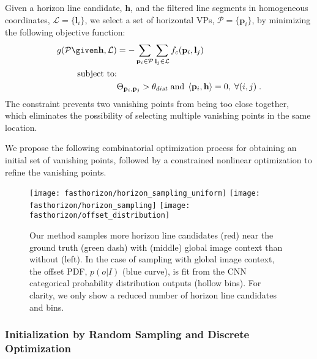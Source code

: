 Given a horizon line candidate, $\mathbf{h}$, and the filtered line segments
in homogeneous coordinates, $\mathcal{L} = \{\mathbf{l}_i\}$, we select
a set of horizontal VPs, $\mathcal{P} = \{\mathbf{p}_i\}$, by minimizing
the following objective function:
%
\begin{align} 
  g(\mathcal{P} \given \mathbf{h}, \mathcal{L}) & = -\sum_{\mathbf{p}_i
    \in \mathcal{P}} {\sum_{\mathbf{l}_j \in
      \mathcal{L}}f_c(\mathbf{p}_i, \mathbf{l}_j)}
  \label{eq:obj} \\
  \text{subject to:} \nonumber \\
   & \Theta_{\mathbf{p}_i,\mathbf{p}_j} > \theta_{dist}
  \; \text{and} \; \left< \mathbf{p}_i,\mathbf{h} \right>=0, 
  \; \forall (i,j) \nonumber \; .
\end{align} 
%
The constraint prevents two vanishing points from being too close
together, which eliminates the possibility of selecting multiple
vanishing points in the same location.

We propose the following combinatorial optimization process for
obtaining an initial set of vanishing points, followed by a
constrained nonlinear optimization to refine the vanishing points.

\begin{figure}
  \centering
  \texttt{[image: fasthorizon/horizon\_sampling\_uniform]}
  \texttt{[image: fasthorizon/horizon\_sampling]}
  \texttt{[image: fasthorizon/offset\_distribution]}
  \caption{Our method samples more horizon line candidates (red) near
    the ground truth (green dash) with (middle) global image context
    than without (left).  In the case of sampling with global image
    context, the offset PDF, $p(o|I)$ (blue curve), is fit from the
    CNN categorical probability distribution outputs (hollow
    bins). For clarity, we only show a reduced number of horizon line
    candidates and bins.}
  \label{fig:horsampling}
\end{figure}

\subsubsection{Initialization by Random Sampling and Discrete
Optimization}
\label{sec:initialization}


